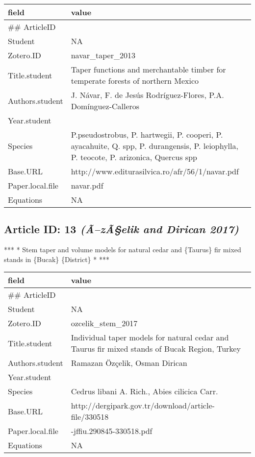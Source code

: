 \documentclass[]{article}
\begin{document}
\begin{table}[H]
\centering
\begin{tabular}{>{\raggedright\arraybackslash}p{2cm}>{\raggedright\arraybackslash}p{8cm}}
\toprule
field & value\\
\midrule
\#\# ArticleID & 12\\
Student & NA\\
Zotero.ID & navar\_taper\_2013\\
Title.student & Taper functions and merchantable timber for temperate forests of northern Mexico\\
Authors.student & J. Návar, F. de Jesús Rodríguez-Flores, P.A. Domínguez-Calleros\\
\addlinespace
Year.student & 2013\\
Species & P.pseudostrobus, P. hartwegii, P. cooperi, P. ayacahuite, Q. spp, P. durangensis, P. leiophylla, P. teocote, P. arizonica, Quercus spp\\
Base.URL & http://www.editurasilvica.ro/afr/56/1/navar.pdf\\
Paper.local.file & navar.pdf\\
Equations & NA\\
\bottomrule
\end{tabular}
\end{table}

\hypertarget{article-id-13-azaelik-and-dirican-2017}{%
\subsection{\texorpdfstring{Article ID: 13 \textbf{\emph{(Ã--zÃ§elik and
Dirican
2017)}}}{Article ID: 13 (Ã--zÃ§elik and Dirican 2017)}}\label{article-id-13-azaelik-and-dirican-2017}}

*** * Stem taper and volume models for natural cedar and \{Taurus\} fir
mixed stands in \{Bucak\} \{District\} * ***

\begin{table}[H]
\centering
\begin{tabular}{>{\raggedright\arraybackslash}p{2cm}>{\raggedright\arraybackslash}p{8cm}}
\toprule
field & value\\
\midrule
\#\# ArticleID & 13\\
Student & NA\\
Zotero.ID & ozcelik\_stem\_2017\\
Title.student & Individual taper models for natural cedar and Taurus fir mixed stands of Bucak Region, Turkey\\
Authors.student & Ramazan Özçelik, Osman Dirican\\
\addlinespace
Year.student & 2017\\
Species & Cedrus libani A. Rich., Abies cilicica Carr.\\
Base.URL & http://dergipark.gov.tr/download/article-file/330518\\
Paper.local.file & 10.17099-jffiu.290845-330518.pdf\\
Equations & NA\\
\bottomrule
\end{tabular}
\end{table}
\end{document}
